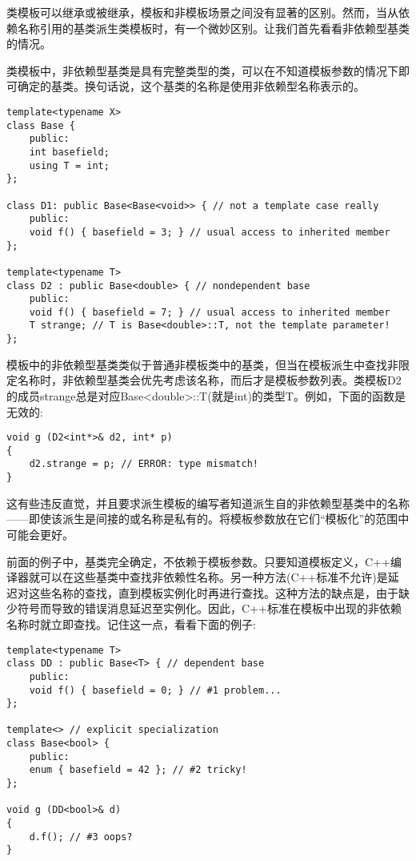 
类模板可以继承或被继承，模板和非模板场景之间没有显著的区别。然而，当从依赖名称引用的基类派生类模板时，有一个微妙区别。让我们首先看看非依赖型基类的情况。


类模板中，非依赖型基类是具有完整类型的类，可以在不知道模板参数的情况下即可确定的基类。换句话说，这个基类的名称是使用非依赖型名称表示的。

\begin{lstlisting}[style=styleCXX]
template<typename X>
class Base {
	public:
	int basefield;
	using T = int;
};

class D1: public Base<Base<void>> { // not a template case really
	public:
	void f() { basefield = 3; } // usual access to inherited member
};

template<typename T>
class D2 : public Base<double> { // nondependent base
	public:
	void f() { basefield = 7; } // usual access to inherited member
	T strange; // T is Base<double>::T, not the template parameter!
};
\end{lstlisting}

模板中的非依赖型基类类似于普通非模板类中的基类，但当在模板派生中查找非限定名称时，非依赖型基类会优先考虑该名称，而后才是模板参数列表。类模板D2的成员strange总是对应Base<double>::T(就是int)的类型T。例如，下面的函数是无效的:

\begin{lstlisting}[style=styleCXX]
void g (D2<int*>& d2, int* p)
{
	d2.strange = p; // ERROR: type mismatch!
}
\end{lstlisting}

这有些违反直觉，并且要求派生模板的编写者知道派生自的非依赖型基类中的名称——即使该派生是间接的或名称是私有的。将模板参数放在它们“模板化”的范围中可能会更好。


前面的例子中，基类完全确定，不依赖于模板参数。只要知道模板定义，C++编译器就可以在这些基类中查找非依赖性名称。另一种方法(C++标准不允许)是延迟对这些名称的查找，直到模板实例化时再进行查找。这种方法的缺点是，由于缺少符号而导致的错误消息延迟至实例化。因此，C++标准在模板中出现的非依赖名称时就立即查找。记住这一点，看看下面的例子:

\begin{lstlisting}[style=styleCXX]
template<typename T>
class DD : public Base<T> { // dependent base
	public:
	void f() { basefield = 0; } // #1 problem...
};

template<> // explicit specialization
class Base<bool> {
	public:
	enum { basefield = 42 }; // #2 tricky!
};

void g (DD<bool>& d)
{
	d.f(); // #3 oops?
}
\end{lstlisting}

